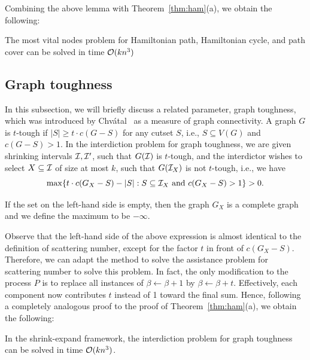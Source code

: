 Combining the above lemma with Theorem~\ref{thm:ham}(a), we obtain the following:
\begin{corollary}
The most vital nodes problem  for Hamiltonian path, Hamiltonian cycle, and path cover can be solved in time $\mathcal{O}(kn^3)$
\end{corollary}

\subsection{Graph toughness}
\label{subsection:tough}
In this subsection, we will briefly discuss a related parameter, graph toughness, which was introduced by Chv\'{a}tal~\cite{Chvatal1973} as a measure of graph connectivity. 
A graph $G$ is $t$-tough if $|S| \geq t \cdot c(G - S)$ for any cutset $S$, i.e., $S \subseteq V(G)$ and $c(G - S) > 1$.
In the interdiction problem for graph toughness, we are given shrinking intervals $\mathcal{I}, \mathcal{I}'$, such that $G(\mathcal{I})$ is $t$-tough, and the interdictor wishes to select $X \subseteq \mathcal{I}$ of size at most $k$, such that $G(\mathcal{I}_X)$ is not $t$-tough, i.e., we have
\[
	\max \{t \cdot c(G_X - S) - |S|  : S \subseteq \mathcal{I}_X \text{ and } c(G_X - S) > 1 \} > 0.
\]

If the set on the left-hand side is empty, then the graph $G_X$ is a complete graph and we define the maximum to be $-\infty$.

Observe that the left-hand side of the above expression is almost identical to the definition of scattering number, except for the factor $t$ in front of $c(G_X - S)$.
Therefore, we can adapt the method to solve the assistance problem for scattering number to solve this problem.
In fact, the only modification to the process $P$ is to replace all instances of $\beta \leftarrow \beta + 1$ by $\beta \leftarrow \beta + t$.
Effectively, each component now contributes $t$ instead of 1 toward the final sum.
Hence, following a completely analogous proof to the proof of Theorem~\ref{thm:ham}(a), we obtain the following:

\begin{corollary}
In the shrink-expand framework, the interdiction problem for graph toughness can be solved in time $\mathcal{O}(kn^3)$.
\end{corollary}
